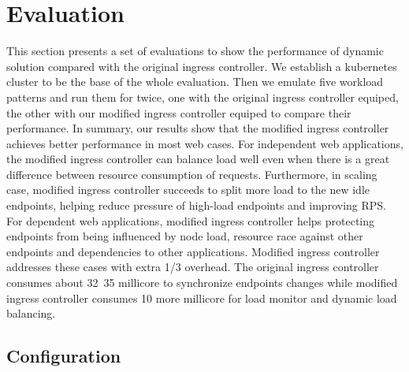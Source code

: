 \section{Evaluation}
\label{sec:evaluation}
This section presents a set of evaluations to show the performance of dynamic solution compared with the original ingress controller. We establish a kubernetes cluster to be the base of the whole evaluation. Then we emulate five workload patterns and run them for twice, one with the original ingress controller equiped, the other with our modified ingress controller equiped to compare their performance.
In summary, our results show that the modified ingress controller achieves better performance in most web cases. For
independent web applications, the modified ingress controller can balance load well even when there is a great difference between resource consumption of requests. Furthermore, in scaling case, modified ingress controller succeeds to split more load to the new idle endpoints, helping reduce pressure of high-load endpoints and improving RPS. For dependent web applications, modified ingress controller helps protecting endpoints from being influenced by node load, resource race against other endpoints and dependencies to other applications. Modified ingress controller addresses these cases with extra 1/3 overhead. The original ingress controller consumes about 32~35 millicore to synchronize endpoints changes while modified ingress controller consumes 10 more millicore for load monitor and dynamic load balancing.

\subsection{Configuration}

